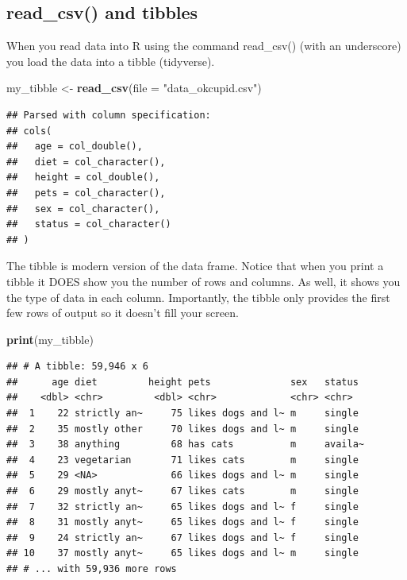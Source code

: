 \documentclass[
]{krantz}
\makeatletter
\newenvironment{Shaded}{\begin{snugshade}}{\end{snugshade}}
\newcommand{\DataTypeTok}[1]{\textcolor[rgb]{0.27,0.27,0.27}{#1}}
\newcommand{\KeywordTok}[1]{\textcolor[rgb]{0.27,0.27,0.27}{\textbf{#1}}}
\newcommand{\NormalTok}[1]{#1}
\newcommand{\StringTok}[1]{\textcolor[rgb]{0.5,0.5,0.5}{#1}}
\newenvironment{kframe}{%
\medskip{}
\setlength{\fboxsep}{.8em}
 \def\at@end@of@kframe{}%
 \ifinner\ifhmode%
  \def\at@end@of@kframe{\end{minipage}}%
  \begin{minipage}{\columnwidth}%
 \fi\fi%
 \def\FrameCommand##1{\hskip\@totalleftmargin \hskip-\fboxsep
 \colorbox{shadecolor}{##1}\hskip-\fboxsep
     \hskip-\linewidth \hskip-\@totalleftmargin \hskip\columnwidth}%
 \MakeFramed {\advance\hsize-\width
   \@totalleftmargin\z@ \linewidth\hsize
   \@setminipage}}%
 {\par\unskip\endMakeFramed%
 \at@end@of@kframe}
\renewenvironment{Shaded}{\begin{kframe}}{\end{kframe}}
\makeatother
\begin{document}
\hypertarget{read_csv-and-tibbles}{%
\subsection{read\_csv() and tibbles}\label{read_csv-and-tibbles}}

When you read data into R using the command read\_csv() (with an underscore) you load the data into a tibble (tidyverse).

\begin{Shaded}
\begin{Highlighting}[]
\NormalTok{my_tibble <-}\StringTok{ }\KeywordTok{read_csv}\NormalTok{(}\DataTypeTok{file =} \StringTok{"data_okcupid.csv"}\NormalTok{)}
\end{Highlighting}
\end{Shaded}

\begin{verbatim}
## Parsed with column specification:
## cols(
##   age = col_double(),
##   diet = col_character(),
##   height = col_double(),
##   pets = col_character(),
##   sex = col_character(),
##   status = col_character()
## )
\end{verbatim}

The tibble is modern version of the data frame. Notice that when you print a tibble it DOES show you the number of rows and columns. As well, it shows you the type of data in each column. Importantly, the tibble only provides the first few rows of output so it doesn't fill your screen.

\begin{Shaded}
\begin{Highlighting}[]
\KeywordTok{print}\NormalTok{(my_tibble)}
\end{Highlighting}
\end{Shaded}

\begin{verbatim}
## # A tibble: 59,946 x 6
##      age diet         height pets              sex   status 
##    <dbl> <chr>         <dbl> <chr>             <chr> <chr>  
##  1    22 strictly an~     75 likes dogs and l~ m     single 
##  2    35 mostly other     70 likes dogs and l~ m     single 
##  3    38 anything         68 has cats          m     availa~
##  4    23 vegetarian       71 likes cats        m     single 
##  5    29 <NA>             66 likes dogs and l~ m     single 
##  6    29 mostly anyt~     67 likes cats        m     single 
##  7    32 strictly an~     65 likes dogs and l~ f     single 
##  8    31 mostly anyt~     65 likes dogs and l~ f     single 
##  9    24 strictly an~     67 likes dogs and l~ f     single 
## 10    37 mostly anyt~     65 likes dogs and l~ m     single 
## # ... with 59,936 more rows
\end{verbatim}
\end{document}
